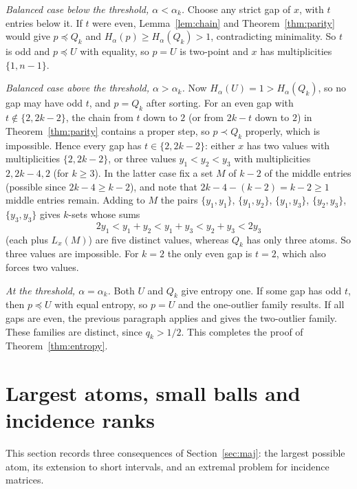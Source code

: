 \documentclass[11pt]{article}
\theoremstyle{remark}
\begin{document}
\emph{Balanced case below the threshold, \(\alpha<\alpha_k\).} Choose any strict
gap of \(x\), with \(t\) entries below it. If \(t\) were even,
Lemma~\ref{lem:chain} and Theorem~\ref{thm:parity} would give
\(p\preceq Q_k\) and \(H_\alpha(p)\ge H_\alpha(Q_k)>1\), contradicting
minimality. So \(t\) is odd and \(p\preceq U\) with equality, so \(p=U\) is
two-point and \(x\) has multiplicities \(\{1,n-1\}\).

\emph{Balanced case above the threshold, \(\alpha>\alpha_k\).} Now
\(H_\alpha(U)=1>H_\alpha(Q_k)\), so no gap may have odd \(t\), and \(p=Q_k\)
after sorting. For an even gap with \(t\notin\{2,2k-2\}\), the chain from
\(t\) down to \(2\) (or from \(2k-t\) down to \(2\)) in Theorem~\ref{thm:parity}
contains a proper step, so \(p\prec Q_k\) properly, which is impossible. Hence
every gap has \(t\in\{2,2k-2\}\): either \(x\) has two values with
multiplicities \(\{2,2k-2\}\), or three values \(y_1<y_2<y_3\) with
multiplicities \(2,2k-4,2\) (for \(k\ge3\)). In the latter case fix a set
\(M\) of \(k-2\) of the middle entries (possible since \(2k-4\ge k-2\)), and
note that \(2k-4-(k-2)=k-2\ge1\) middle entries remain. Adding to \(M\) the
pairs \(\{y_1,y_1\}\), \(\{y_1,y_2\}\), \(\{y_1,y_3\}\), \(\{y_2,y_3\}\),
\(\{y_3,y_3\}\) gives \(k\)-sets whose sums
\[
 2y_1<y_1+y_2<y_1+y_3<y_2+y_3<2y_3
\]
(each plus \(L_x(M)\)) are five distinct values, whereas \(Q_k\) has only three
atoms. So three values are impossible. For \(k=2\) the only even gap is \(t=2\),
which also forces two values.

\emph{At the threshold, \(\alpha=\alpha_k\).} Both \(U\) and \(Q_k\) give
entropy one. If some gap has odd \(t\), then \(p\preceq U\) with equal entropy,
so \(p=U\) and the one-outlier family results. If all gaps are even, the
previous paragraph applies and gives the two-outlier family. These families
are distinct, since \(q_k>1/2\). This completes the proof of
Theorem~\ref{thm:entropy}.

\section{Largest atoms, small balls and incidence ranks}\label{sec:conc}

This section records three consequences of Section~\ref{sec:maj}: the largest
possible atom, its extension to short intervals, and an extremal problem for
incidence matrices.
\end{document}
